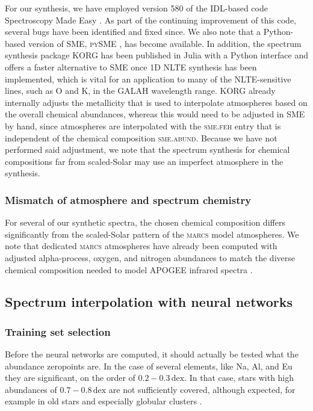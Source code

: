 \documentclass[
  journal=pasa,
  manuscript=research-paper, %
  year=2024,
  volume=37
]{cup-journal}
\newcommand{\marcs}{\textsc{marcs}\xspace}
\begin{document}
For our synthesis, we have employed version 580 of the IDL-based code Spectroscopy Made Easy \citep{Valenti1996, Piskunov2017}. As part of the continuing improvement of this code, several bugs have been identified and fixed since. We also note that a Python-based version of SME, \textsc{pySME} \citep{Wehrhahn2021}, has become available. In addition, the spectrum synthesis package \textsc{KORG} \citep{Wheeler2023, Wheeler2024} has been published in Julia with a Python interface and offers a faster alternative to SME once 1D NLTE synthesis has been implemented, which is vital for an application to many of the NLTE-sensitive lines, such as O and K, in the GALAH wavelength range. \textsc{KORG} already internally adjusts the metallicity that is used to interpolate atmospheres based on the overall chemical abundances, whereas this would need to be adjusted in \textsc{SME} by hand, since atmospheres are interpolated with the \textsc{sme.feh} entry that is independent of the chemical composition \textsc{sme.abund}. Because we have not performed said adjustment, we note that the spectrum synthesis for chemical compositions far from scaled-Solar may use an imperfect atmosphere in the synthesis.

\subsubsection{Mismatch of atmosphere and spectrum chemistry}

For several of our synthetic spectra, the chosen chemical composition differs significantly from the scaled-Solar pattern of the \marcs model atmospheres. We note that dedicated \marcs atmospheres have already been computed with adjusted alpha-process, oxygen, and nitrogen abundances to match the diverse chemical composition needed to model APOGEE infrared spectra \citep{SDSSDR17}.

\subsection{Spectrum interpolation with neural networks} \label{sec:caveats_interpolation}

\subsubsection{Training set selection}

Before the neural networks are computed, it should actually be tested what the abundance zeropoints are. In the case of several elements, like Na, Al, and Eu they are significant, on the order of $0.2-0.3\,\mathrm{dex}$. In that case, stars with high abundances of $0.7-0.8\,\mathrm{dex}$ are not sufficiently covered, although expected, for example in old stars and especially globular clusters \citep[see e.g.][]{Carretta2009}.
\end{document}
